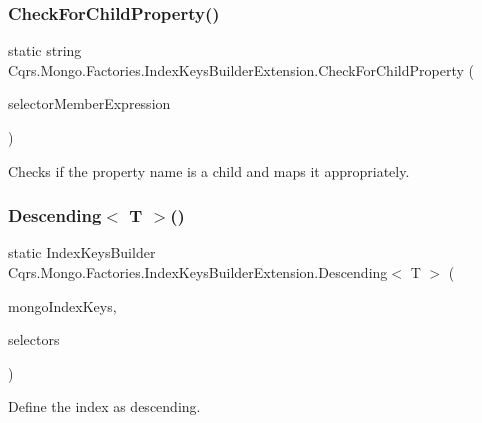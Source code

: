\subsubsection{\texorpdfstring{Check\+For\+Child\+Property()}{CheckForChildProperty()}}
{\footnotesize\ttfamily static string Cqrs.\+Mongo.\+Factories.\+Index\+Keys\+Builder\+Extension.\+Check\+For\+Child\+Property (\begin{DoxyParamCaption}\item[{Member\+Expression}]{selector\+Member\+Expression }\end{DoxyParamCaption})\hspace{0.3cm}{\ttfamily [static]}}



Checks if the property name is a child and maps it appropriately. 

\mbox{\label{classCqrs_1_1Mongo_1_1Factories_1_1IndexKeysBuilderExtension_a9b2a712a921c4b5aea720a56eecb7643_a9b2a712a921c4b5aea720a56eecb7643}} 
\subsubsection{\texorpdfstring{Descending$<$ T $>$()}{Descending< T >()}}
{\footnotesize\ttfamily static Index\+Keys\+Builder Cqrs.\+Mongo.\+Factories.\+Index\+Keys\+Builder\+Extension.\+Descending$<$ T $>$ (\begin{DoxyParamCaption}\item[{this Index\+Keys\+Builder}]{mongo\+Index\+Keys,  }\item[{params Expression$<$ Func$<$ T, object $>$$>$ \mbox{[}$\,$\mbox{]}}]{selectors }\end{DoxyParamCaption})\hspace{0.3cm}{\ttfamily [static]}}



Define the index as descending. 

